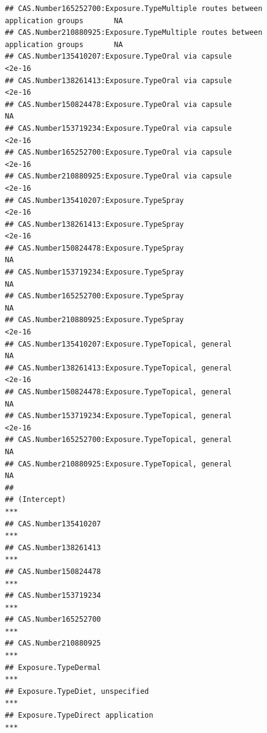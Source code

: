 \documentclass[
  12pt,
]{article}
\begin{document}
\begin{verbatim}
## CAS.Number165252700:Exposure.TypeMultiple routes between application groups       NA
## CAS.Number210880925:Exposure.TypeMultiple routes between application groups       NA
## CAS.Number135410207:Exposure.TypeOral via capsule                             <2e-16
## CAS.Number138261413:Exposure.TypeOral via capsule                             <2e-16
## CAS.Number150824478:Exposure.TypeOral via capsule                                 NA
## CAS.Number153719234:Exposure.TypeOral via capsule                             <2e-16
## CAS.Number165252700:Exposure.TypeOral via capsule                             <2e-16
## CAS.Number210880925:Exposure.TypeOral via capsule                             <2e-16
## CAS.Number135410207:Exposure.TypeSpray                                        <2e-16
## CAS.Number138261413:Exposure.TypeSpray                                        <2e-16
## CAS.Number150824478:Exposure.TypeSpray                                            NA
## CAS.Number153719234:Exposure.TypeSpray                                            NA
## CAS.Number165252700:Exposure.TypeSpray                                            NA
## CAS.Number210880925:Exposure.TypeSpray                                        <2e-16
## CAS.Number135410207:Exposure.TypeTopical, general                                 NA
## CAS.Number138261413:Exposure.TypeTopical, general                             <2e-16
## CAS.Number150824478:Exposure.TypeTopical, general                                 NA
## CAS.Number153719234:Exposure.TypeTopical, general                             <2e-16
## CAS.Number165252700:Exposure.TypeTopical, general                                 NA
## CAS.Number210880925:Exposure.TypeTopical, general                                 NA
##                                                                                
## (Intercept)                                                                 ***
## CAS.Number135410207                                                         ***
## CAS.Number138261413                                                         ***
## CAS.Number150824478                                                         ***
## CAS.Number153719234                                                         ***
## CAS.Number165252700                                                         ***
## CAS.Number210880925                                                         ***
## Exposure.TypeDermal                                                         ***
## Exposure.TypeDiet, unspecified                                              ***
## Exposure.TypeDirect application                                             ***

\end{verbatim}
\end{document}

